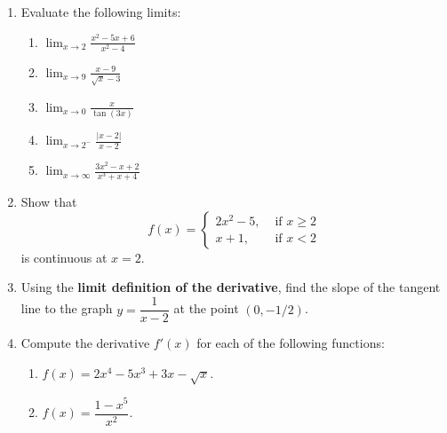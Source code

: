 \documentclass[12pt]{article}
\newcommand{\points}[1]{\marginpar{\hspace{24pt}[#1]}}
\newcommand{\di}{\displaystyle}
\newcommand{\abs}[1]{\lvert #1\rvert}
\begin{document}
 \begin{enumerate}
 \item  Evaluate the following limits:
 \begin{enumerate}
 \item $\di \lim_{x\to 2}\frac{x^2-5x+6}{x^2-4}$ \points{2}
 
 \vspace{1.25in}
 
 \item $\di \lim_{x\to 9}\frac{x-9}{\sqrt{x}-3}$ \points{2}
 
 \vspace{1.25in}
 
 \item $\di \lim_{x\to 0}\frac{x}{\tan(3x)}$ \points{2}
 
 \vspace{1.5in}
 
 \item $\di \lim_{x\to 2^-}\frac{\abs{x-2}}{x-2}$ \points{2}
 
 \vspace{1.5in}
 
 \item $\di\lim_{x\to \infty}\frac{3x^2-x+2}{x^3+x+4}$ \points{2}
 \end{enumerate}
 \newpage
 
 \item Show that \points{5}
 \[
 f(x) = \begin{cases} 2x^2-5, & \text{ if } x\geq 2\\ x+1, & \text{ if } x<2\end{cases}
 \]
 is continuous at $x=2$.
 
 \vspace{3.25in}
 
 \item Using the \textbf{limit definition of the derivative}, find the slope of the tangent line to the graph $y=\dfrac{1}{x-2}$ at the point $(0,-1/2)$. \points{5}
 
 \newpage
 
 \item Compute the derivative $f'(x)$ for each of the following functions:
 \begin{enumerate}
 \item $f(x) = 2x^4-5x^3+3x-\sqrt{x}$. \points{2}
 
 \vspace{1.25in}
 
 \item $f(x) = \dfrac{1-x^5}{x^2}$. \points{2}
 

\end{enumerate}
\end{enumerate}
\end{document}
